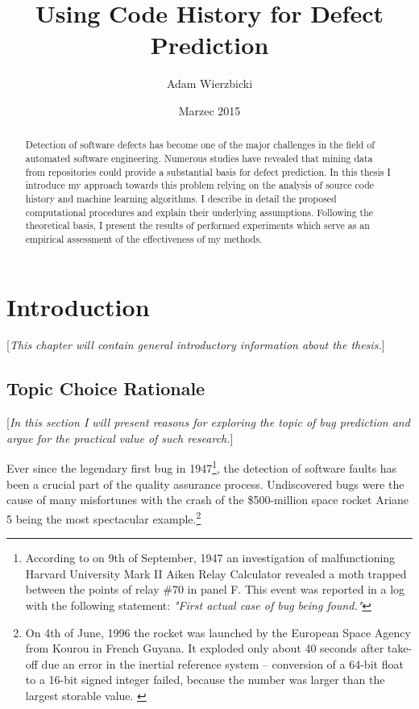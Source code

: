 \documentclass{pracamgr}
\author{Adam Wierzbicki}
\title{Using Code History for Defect Prediction}
\date{Marzec 2015}
\begin{document}
\maketitle

\begin{abstract}
Detection of software defects has become one of the major challenges in the field of automated software engineering. Numerous studies have revealed that mining data from repositories could provide a substantial basis for defect prediction. In this thesis I introduce my approach towards this problem relying on the analysis of source code history and machine learning algorithms. I describe in detail the proposed computational procedures and explain their underlying assumptions. Following the theoretical basis, I  present the results of performed experiments which serve as an empirical assessment of the effectiveness of my methods.
\end{abstract}

\tableofcontents

\chapter{Introduction}
[\textit{This chapter will contain general introductory information about the thesis.}]

\section{Topic Choice Rationale}
[\textit{In this section I will present reasons for exploring the topic of bug prediction and argue for the practical value of such research.}]

Ever since the legendary first bug in 1947\footnote{According to \cite{first_bug} on 9th of September, 1947 an investigation of malfunctioning Harvard University Mark II Aiken Relay Calculator revealed a moth trapped between the points of relay \#70 in panel F. This event was reported in a log with the following statement: \textit{"First actual case of bug being found."}}, the detection of software faults has been a crucial part of the quality assurance process. Undiscovered bugs were the cause of many misfortunes with the crash of the \$500-million space rocket Ariane 5 being the most spectacular example.\footnote{On 4th of June, 1996 the rocket was launched by the European Space Agency from Kourou in French Guyana. It exploded only about 40 seconds after take-off due an error in the inertial reference system -- conversion of a 64-bit float to a 16-bit signed integer failed, because the number was larger than the largest storable value. \cite{ariane}}
\end{document}
